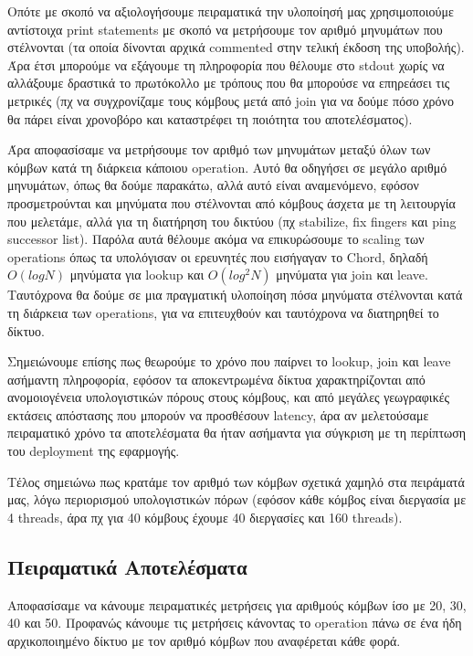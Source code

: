 \documentclass[12pt,a4paper]{article}
\begin{document}
Οπότε με σκοπό να αξιολογήσουμε πειραματικά την υλοποίησή μας χρησιμοποιούμε αντίστοιχα print statements με σκοπό να μετρήσουμε τον αριθμό μηνυμάτων που στέλνονται (τα οποία δίνονται αρχικά commented στην τελική έκδοση της υποβολής). Άρα έτσι μπορούμε να εξάγουμε τη πληροφορία που θέλουμε στο stdout χωρίς να αλλάξουμε δραστικά το πρωτόκολλο με τρόπους που θα μπορούσε να επηρεάσει τις μετρικές (πχ να συγχρονίζαμε τους κόμβους μετά από join για να δούμε πόσο χρόνο θα πάρει είναι χρονοβόρο και καταστρέφει τη ποιότητα του αποτελέσματος).

Άρα αποφασίσαμε να μετρήσουμε τον αριθμό των μηνυμάτων μεταξύ όλων των κόμβων κατά τη διάρκεια κάποιου operation. Αυτό θα οδηγήσει σε μεγάλο αριθμό μηνυμάτων, όπως θα δούμε παρακάτω, αλλά αυτό είναι αναμενόμενο, εφόσον προσμετρούνται και μηνύματα που στέλνονται από κόμβους άσχετα με τη λειτουργία που μελετάμε, αλλά για τη διατήρηση του δικτύου (πχ stabilize, fix fingers και ping successor list). Παρόλα αυτά θέλουμε ακόμα να επικυρώσουμε το scaling των operations όπως τα υπολόγισαν οι ερευνητές που εισήγαγαν το Chord, δηλαδή $O(logN)$ μηνύματα για lookup και $O(log^2Ν)$ μηνύματα για join και leave. Ταυτόχρονα θα δούμε σε μια πραγματική υλοποίηση πόσα μηνύματα στέλνονται κατά τη διάρκεια των operations, για να επιτευχθούν και ταυτόχρονα να διατηρηθεί το δίκτυο.

Σημειώνουμε επίσης πως θεωρούμε το χρόνο που παίρνει το lookup, join και leave ασήμαντη πληροφορία, εφόσον τα αποκεντρωμένα δίκτυα χαρακτηρίζονται από ανομοιογένεια υπολογιστικών πόρους στους κόμβους, και από μεγάλες γεωγραφικές εκτάσεις απόστασης που μπορούν να προσθέσουν latency, άρα αν μελετούσαμε πειραματικό χρόνο τα αποτελέσματα θα ήταν ασήμαντα για σύγκριση με τη περίπτωση του deployment της εφαρμογής.

Τέλος σημειώνω πως κρατάμε τον αριθμό των κόμβων σχετικά χαμηλό στα πειράματά μας, λόγω περιορισμού υπολογιστικών πόρων (εφόσον κάθε κόμβος είναι διεργασία με 4 threads, άρα πχ για 40 κόμβους έχουμε 40 διεργασίες και 160 threads).

\subsection{Πειραματικά Αποτελέσματα}

Αποφασίσαμε να κάνουμε πειραματικές μετρήσεις για αριθμούς κόμβων ίσο με 20, 30, 40 και 50. Προφανώς κάνουμε τις μετρήσεις κάνοντας το operation πάνω σε ένα ήδη αρχικοποιημένο δίκτυο με τον αριθμό κόμβων που αναφέρεται κάθε φορά.
\end{document}

